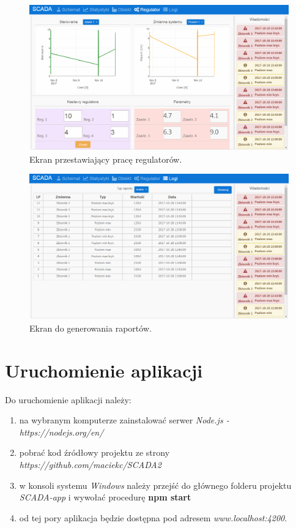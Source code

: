 \begin{figure}[H]
	\centering
	\includegraphics[scale = 0.5]{fig/sc4.png}
	\caption{Ekran przestawiający pracę regulatorów.}
	\label{fig:sc4}
\end{figure}

\begin{figure}[H]
	\centering
	\includegraphics[scale = 0.5]{fig/sc5.png}
	\caption{Ekran do generowania raportów.}
	\label{fig:sc5}
\end{figure}

\section{Uruchomienie aplikacji}
Do uruchomienie aplikacji należy: 
\begin{enumerate}
	\item na wybranym komputerze zainstalować serwer \textit{Node.js - https://nodejs.org/en/}
	\item  pobrać kod \'zródłowy projektu ze strony \textit{https://github.com/maciekc/SCADA2}
	\item w konsoli systemu \textit{Windows} należy przejść do głównego folderu projektu  \textit{SCADA-app} i wywołać procedurę \textbf{npm start}
	\item od tej pory aplikacja będzie dostępna pod adresem \textit{www.localhost:4200}.
	
\end{enumerate}